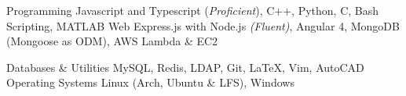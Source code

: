 \begin{cvskills}

	\cvskill
		{Programming}
		{ Javascript and Typescript (\textit{Proficient}), C++, Python, C, Bash Scripting, MATLAB}
	\cvskill
		{Web}
		{Express.js with Node.js \textit{(Fluent)}, Angular 4, MongoDB (Mongoose as ODM), AWS Lambda \& EC2}

	\cvskill
	{Databases \& Utilities}
		{MySQL, Redis, LDAP, Git, \LaTeX, Vim, AutoCAD}
	\cvskill
		{Operating Systems}
		{Linux (Arch, Ubuntu \& LFS), Windows}
\end{cvskills}

